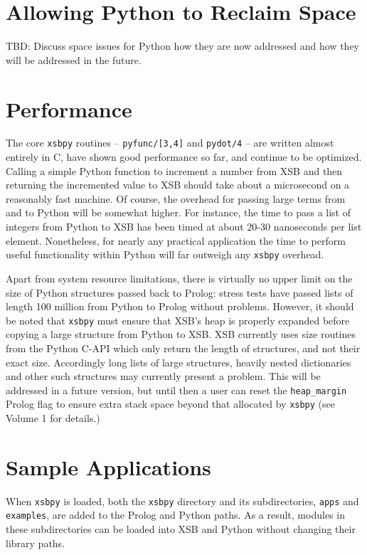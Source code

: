 \section{Allowing Python to Reclaim Space}
%
TBD: Discuss space issues for Python how they are now addressed and
how they will be addressed in the future.

\section{Performance}

The core {\tt xsbpy} routines -- {\tt pyfunc/[3,4]} and {\tt pydot/4}
-- are written almost entirely in C, have shown good performance so
far, and continue to be optimized.  Calling a simple Python function
to increment a number from XSB and then returning the incremented
value to XSB should take about a microsecond on a reasonably fast
machine.  Of course, the overhead for passing large terms from and to
Python will be somewhat higher.  For instance, the time to pass a list
of integers from Python to XSB has been timed at about 20-30
nanoseconds per list element.  Nonetheless, for nearly any practical
application the time to perform useful functionality within Python
will far outweigh any {\tt xsbpy} overhead.

Apart from system resource limitations, there is virtually no upper
limit on the size of Python structures passed back to Prolog: stress
tests have passed lists of length 100 million from Python to Prolog
without problems. However, it should be noted that {\tt xsbpy} must
ensure that XSB's heap is properly expanded before copying a large
structure from Python to XSB.  XSB currently uses size routines from
the Python C-API which only return the length of structures, and not
their exact size.  Accordingly long lists of large structures, heavily
nested dictionaries and other such structures may currently present a
problem.  This will be addressed in a future version, but until then a
user can reset the {\tt heap\_margin} Prolog flag to ensure extra
stack space beyond that allocated by {\tt xsbpy} (see Volume 1 for
details.)

\section{Sample Applications}
When {\tt xsbpy} is loaded, both the {\tt xsbpy} directory and its
subdirectories, {\tt apps} and {\tt examples}, are added to the Prolog
and Python paths.  As a result, modules in these subdirectories can be
loaded into XSB and Python without changing their library paths.

